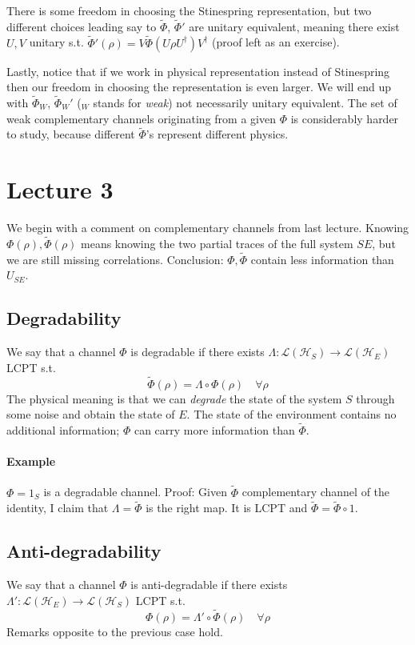 \documentclass[a4paper, 11pt]{article}
\newcommand{\HH}{\mathcal{H}}
\begin{document}
	There is some freedom in choosing the Stinespring representation, but two different choices leading say to $\tilde{\Phi}$, $\tilde{\Phi}'$ are unitary equivalent, meaning there exist $U,V$ unitary s.t. $\tilde{\Phi}'(\rho) = V \tilde{\Phi}\left( U \rho U^\dagger \right) V^\dagger$ (proof left as an exercise).
	
	Lastly, notice that if we work in physical representation instead of Stinespring then our freedom in choosing the representation is even larger.
	We will end up with $\tilde{\Phi}_W$, $\tilde{\Phi}_W'$ ($_W$ stands for \emph{weak}) not necessarily unitary equivalent. The set of weak complementary channels originating from a given $\Phi$ is considerably harder to study, because different $\tilde{\Phi}$'s represent different physics.
	
	\section{Lecture 3}
	We begin with a comment on complementary channels from last lecture. Knowing $\Phi(\rho),\tilde{\Phi}(\rho)$ means knowing the two partial traces of the full system $SE$, but we are still missing correlations. Conclusion: $\Phi,\tilde{\Phi}$ contain less information than $U_{SE}$.
	
	\subsection{Degradability}
	We say that a channel $\Phi$ is degradable if there exists $\Lambda:\mathcal{L}(\HH_S)\rightarrow\mathcal{L}(\HH_E)$ LCPT s.t.
	\[ \tilde{\Phi}(\rho) = \Lambda \circ \Phi(\rho) \quad \forall \rho \]
	The physical meaning is that we can \emph{degrade} the state of the system $S$ through some noise and obtain the state of $E$. The state of the environment contains no additional information; $\Phi$ can carry more information than $\tilde{\Phi}$.
	
	\paragraph{Example} $\Phi = 1_S$ is a degradable channel. Proof: Given $\tilde{\Phi}$ complementary channel of the identity, I claim that $\Lambda = \tilde{\Phi}$ is the right map. It is LCPT and $\tilde{\Phi} = \tilde{\Phi} \circ 1$.
	
	\subsection{Anti-degradability}
	We say that a channel $\Phi$ is anti-degradable if there exists $\Lambda':\mathcal{L}(\HH_E)\rightarrow\mathcal{L}(\HH_S)$ LCPT s.t.
	\[ {\Phi}(\rho) = \Lambda' \circ \tilde{\Phi}(\rho) \quad \forall \rho \]
	Remarks opposite to the previous case hold.
	
\end{document}
